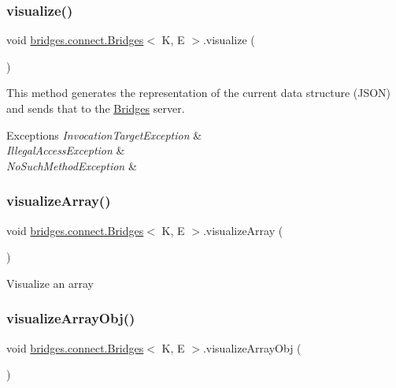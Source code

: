 \subsubsection{\texorpdfstring{visualize()}{visualize()}}
{\footnotesize\ttfamily void \hyperlink{classbridges_1_1connect_1_1_bridges}{bridges.\+connect.\+Bridges}$<$ K, E $>$.visualize (\begin{DoxyParamCaption}{ }\end{DoxyParamCaption})}

This method generates the representation of the current data structure (J\+S\+ON) and sends that to the \hyperlink{classbridges_1_1connect_1_1_bridges}{Bridges} server.


\begin{DoxyExceptions}{Exceptions}
{\em Invocation\+Target\+Exception} & \\
\hline
{\em Illegal\+Access\+Exception} & \\
\hline
{\em No\+Such\+Method\+Exception} & \\
\hline
\end{DoxyExceptions}
\hypertarget{classbridges_1_1connect_1_1_bridges_ac4e90699b288fcfbaf19e59bc4dbafb3}{}\label{classbridges_1_1connect_1_1_bridges_ac4e90699b288fcfbaf19e59bc4dbafb3} 
\subsubsection{\texorpdfstring{visualize\+Array()}{visualizeArray()}}
{\footnotesize\ttfamily void \hyperlink{classbridges_1_1connect_1_1_bridges}{bridges.\+connect.\+Bridges}$<$ K, E $>$.visualize\+Array (\begin{DoxyParamCaption}{ }\end{DoxyParamCaption})\hspace{0.3cm}{\ttfamily [protected]}}

Visualize an array \hypertarget{classbridges_1_1connect_1_1_bridges_a7533ebb339527a3a824fc7af21a1d5c9}{}\label{classbridges_1_1connect_1_1_bridges_a7533ebb339527a3a824fc7af21a1d5c9} 
\subsubsection{\texorpdfstring{visualize\+Array\+Obj()}{visualizeArrayObj()}}
{\footnotesize\ttfamily void \hyperlink{classbridges_1_1connect_1_1_bridges}{bridges.\+connect.\+Bridges}$<$ K, E $>$.visualize\+Array\+Obj (\begin{DoxyParamCaption}{ }\end{DoxyParamCaption})\hspace{0.3cm}{\ttfamily [protected]}}

